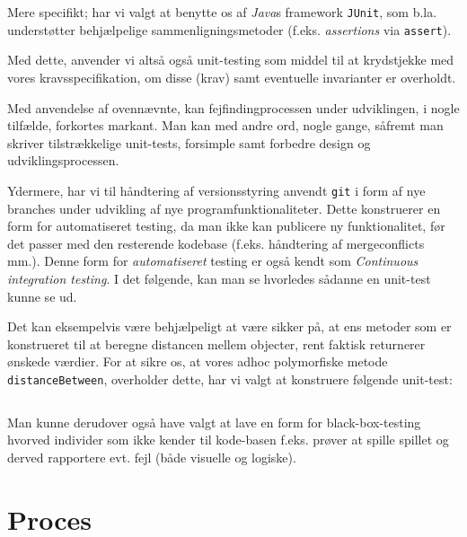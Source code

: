 \documentclass{article}
\newcommand{\code}[1]{\small\texttt{#1}}
\newcommand{\snippet}[3]{\inputminted[firstline=#1,lastline=#2,linenos,
xleftmargin=1.5em, breaklines]{java}{#3}}
\theoremstyle{mytheoremstyle}
\theoremstyle{mytheoremstyle}
\theoremstyle{myproblemstyle}
\begin{document}
Mere specifikt; har vi valgt at benytte os af \textit{Java}s framework
\code{JUnit}, som b.la. understøtter behjælpelige sammenligningsmetoder (f.eks.
\textit{assertions} via \code{assert}).

Med dette, anvender vi altså også unit-testing som middel til at krydstjekke med
vores kravsspecifikation, om disse (krav) samt eventuelle invarianter er
overholdt.

Med anvendelse af ovennævnte, kan fejfindingprocessen under udviklingen, i nogle
tilfælde, forkortes markant. Man kan med andre ord, nogle gange, såfremt man
skriver tilstrækkelige unit-tests, forsimple samt forbedre design og
udviklingsprocessen.

Ydermere, har vi til håndtering af versionsstyring anvendt \code{git} i form af
nye branches under udvikling af nye programfunktionaliteter. Dette konstruerer
en form for automatiseret testing, da man ikke kan publicere ny funktionalitet,
før det passer med den resterende kodebase (f.eks. håndtering af mergeconflicts
mm.). Denne form for \textit{automatiseret} testing er også kendt som
\textit{Continuous integration testing}. I det følgende, kan man se hvorledes sådanne en unit-test kunne se ud.

Det kan eksempelvis være behjælpeligt at være sikker på, at ens metoder som er konstrueret til at beregne distancen mellem objecter, rent faktisk returnerer ønskede værdier. For at sikre os, at vores adhoc polymorfiske metode \code{distanceBetween}, overholder dette, har vi valgt at konstruere følgende unit-test:
\snippet{12}{55}{./code/AlgebraTest.java}

Man kunne derudover også have valgt at lave en form for black-box-testing hvorved individer som ikke kender til kode-basen f.eks. prøver at spille spillet og derved rapportere evt. fejl (både visuelle og logiske).

\section{Proces}\label{sec:Proces} %
\end{document}

